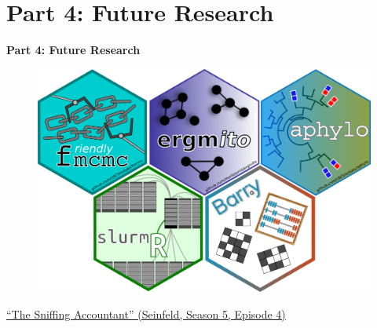 \documentclass[aspectratio=169, 9pt, handout]{beamer}
\begin{document}
\section{Part 4: Future Research}

\begin{frame}[t]
	\textcolor{uscgold}{
		\Large {\bf Part 4: Future Research} 
	}
\end{frame}

\begin{frame}
	\begin{figure}
		\includegraphics[width=.7\linewidth]{fig-packages/hexlogos.png}
	\end{figure}
\end{frame}

\begin{frame}[c]
	\centering
	
	\pause
	\vfill\raggedright {\footnotesize \href{https://en.wikipedia.org/wiki/The_Sniffing_Accountant}{``The Sniffing Accountant'' (Seinfeld, Season 5, Episode 4)}}
\end{frame}
\end{document}
